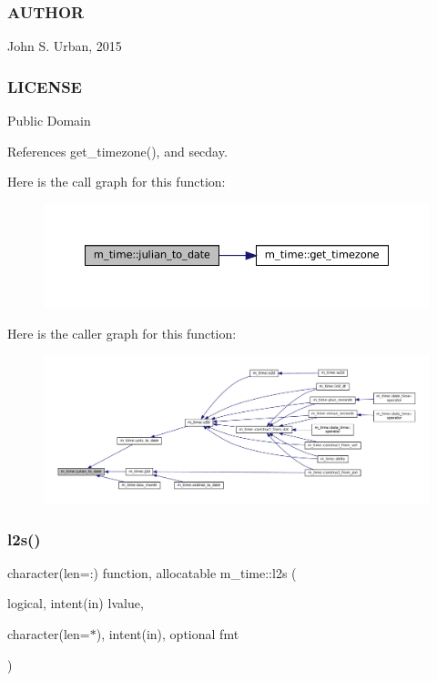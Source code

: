\subsubsection*{A\+U\+T\+H\+OR}

John S. Urban, 2015 \subsubsection*{L\+I\+C\+E\+N\+SE}

Public Domain 

References get\+\_\+timezone(), and secday.

Here is the call graph for this function\+:\nopagebreak
\begin{figure}[H]
\begin{center}
\leavevmode
\includegraphics[width=350pt]{namespacem__time_abb44cf18cd0a3e420c20469efb056203_cgraph}
\end{center}
\end{figure}
Here is the caller graph for this function\+:\nopagebreak
\begin{figure}[H]
\begin{center}
\leavevmode
\includegraphics[width=350pt]{namespacem__time_abb44cf18cd0a3e420c20469efb056203_icgraph}
\end{center}
\end{figure}
\mbox{\label{namespacem__time_a03e90459e69ffa353d1a6ce5765836fd}} 
\subsubsection{\texorpdfstring{l2s()}{l2s()}}
{\footnotesize\ttfamily character(len=\+:) function, allocatable m\+\_\+time\+::l2s (\begin{DoxyParamCaption}\item[{logical, intent(in)}]{lvalue,  }\item[{character(len=$\ast$), intent(in), optional}]{fmt }\end{DoxyParamCaption})\hspace{0.3cm}{\ttfamily [private]}}



